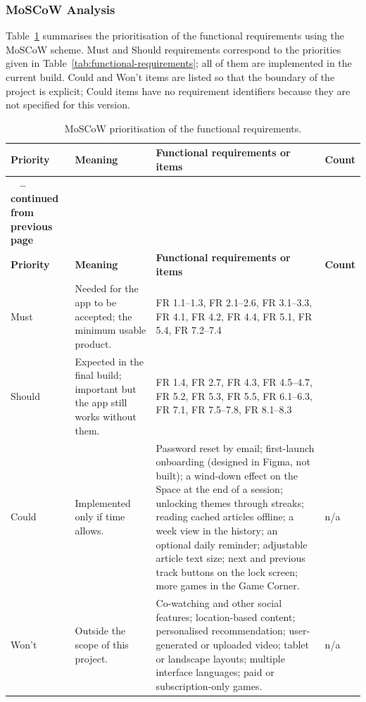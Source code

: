 \subsubsection{MoSCoW Analysis}

Table~\ref{tab:moscow} summarises the prioritisation of the functional
requirements using the MoSCoW scheme. Must and Should requirements correspond
to the priorities given in Table~\ref{tab:functional-requirements}; all of them
are implemented in the current build. Could and Won't items are listed so that
the boundary of the project is explicit; Could items have no requirement
identifiers because they are not specified for this version.

\begingroup
\small
\renewcommand{\arraystretch}{1.25}
\begin{longtable}{|>{\raggedright\arraybackslash}p{1.5cm}|>{\raggedright\arraybackslash}p{3.2cm}|>{\raggedright\arraybackslash}p{8.4cm}|>{\centering\arraybackslash}p{1.3cm}|}
\caption{MoSCoW prioritisation of the functional requirements.}
\label{tab:moscow}\\
\hline
\textbf{Priority} & \textbf{Meaning} & \textbf{Functional requirements or items} &
\textbf{Count} \\ \hline
\endfirsthead
\multicolumn{4}{c}%
{{\bfseries \tablename\ \thetable{} -- continued from previous page}} \\
\hline
\textbf{Priority} & \textbf{Meaning} & \textbf{Functional requirements or items} &
\textbf{Count} \\ \hline
\endhead
\hline
\endfoot

Must &
Needed for the app to be accepted; the minimum usable product. &
FR 1.1--1.3, FR 2.1--2.6, FR 3.1--3.3, FR 4.1, FR 4.2, FR 4.4, FR 5.1,
FR 5.4, FR 7.2--7.4 &
20 \\ \hline

Should &
Expected in the final build; important but the app still works without them. &
FR 1.4, FR 2.7, FR 4.3, FR 4.5--4.7, FR 5.2, FR 5.3, FR 5.5, FR 6.1--6.3,
FR 7.1, FR 7.5--7.8, FR 8.1--8.3 &
20 \\ \hline

Could &
Implemented only if time allows. &
Password reset by email; first-launch onboarding (designed in Figma, not
built); a wind-down effect on the Space at the end of a session; unlocking
themes through streaks; reading cached articles offline; a week view in the
history; an optional daily reminder; adjustable article text size; next and
previous track buttons on the lock screen; more games in the Game Corner. &
n/a \\ \hline

Won't &
Outside the scope of this project. &
Co-watching and other social features; location-based content; personalised
recommendation; user-generated or uploaded video; tablet or landscape
layouts; multiple interface languages; paid or subscription-only games. &
n/a \\ \hline
\end{longtable}
\endgroup
